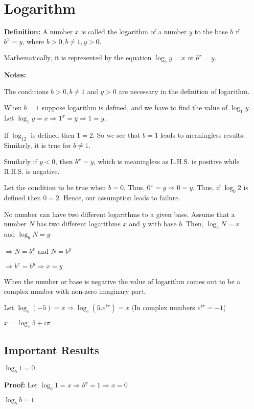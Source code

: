 \setcounter[userpage][0]
\chapter{Logarithm}
{\bf Definition:} A number $x$ is called the logarithm of a number $y$ to the base $b$ if $b^x = y$, where $b > 0, b\neq 1, y > 0$.

\noindent Mathematically, it is represented by the equation $\log_b y = x$ or $b^x = y$.

{\bf Notes:}
\startitemize[n]
\item The conditions $b>0, b\neq 1$ and $y>0$ are necessary in the definition of logarithm.
\item When $b=1$ suppose logarithm is defined, and we have to find the value of $\log_1y$. Let
  $\log_1y=x\Rightarrow 1^x=y\Rightarrow 1=y$.

  If $\log_12$ is defined then $1 = 2$. So we see that $b = 1$ leads to meaningless results. Similarly, it is true for $b \neq 1$.
\item Similarly if $y < 0$, then $b^x = y$, which is meaningless as L.H.S. is positive while R.H.S. is negative.
\item Let the condition to be true when $b = 0$. Thus, $0^x = y\Rightarrow 0 = y$. Thus, if $\log_0 2$ is defined then $0 =
  2$. Hence, our assumption leads to failure.
\item No number can have two different logarithms to a given base. Assume that a number $N$ has two different logarithms $x$ and
  $y$ with base $b$. Then, $\log_b N = x$ and $\log_b N = y$

  $\Rightarrow N = b^x$ and $N = b^y$

  $\Rightarrow b^x = b^y \Rightarrow x = y$
\item When the number or base is negative the value of logarithm comes out to be a complex number with non-zero imaginary part.

  Let $\log_e(-5) = x \Rightarrow \log_e(5.e^{i\pi}) = x$ (In complex numbers $e^{i\pi} = -1$)

  $x = \log_e5 + i\pi$
\stopitemize

\section{Important Results}
\startitemize[n]
\item $\log_b 1 = 0$

  {\bf Proof:} Let $\log_b 1 = x\Rightarrow b^x = 1 \Rightarrow x = 0$
\item $\log_b b = 1$

